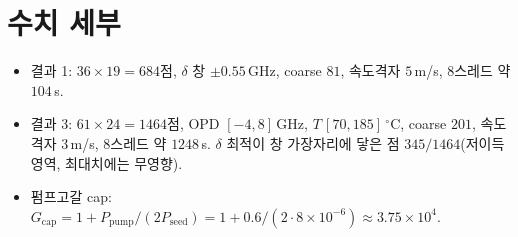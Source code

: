 \documentclass[11pt,a4paper]{article}
\newcommand{\GHz}{\,\mathrm{GHz}}
\newcommand{\degC}{\,^{\circ}\mathrm{C}}
\begin{document}
\section{수치 세부}
\begin{itemize}[nosep]
\item 결과 1: $36\times19=684$점, $\delta$ 창 $\pm0.55\GHz$, coarse $81$, 속도격자 $5\,$m/s,
      8스레드 약 $104\,$s.
\item 결과 3: $61\times24=1464$점, OPD $[-4,8]\GHz$, $T\,[70,185]\degC$, coarse $201$,
      속도격자 $3\,$m/s, 8스레드 약 $1248\,$s. $\delta$ 최적이 창 가장자리에 닿은 점
      $345/1464$(저이득 영역, 최대치에는 무영향).
\item 펌프고갈 cap: $G_{\mathrm{cap}}=1+P_{\mathrm{pump}}/(2P_{\mathrm{seed}})
      =1+0.6/(2\cdot 8\times10^{-6})\approx 3.75\times10^4$.
\end{itemize}
\end{document}
